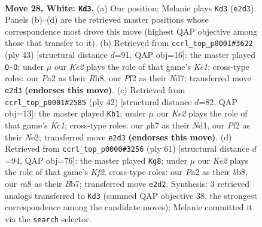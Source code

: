 \documentclass[11pt]{article}
\begin{document}
\clearpage

\begin{figure}[p]\centering
\begin{subfigure}{0.46\textwidth}\centering
\resizebox{\linewidth}{!}{%
\newchessgame
\chessboard[
  setfen={r3r3/1pp3kp/5p2/p2p2b1/6b1/NPB1P3/P3KP2/RN5q w - - 0 28},
  showmover=false,
  pgfstyle=straightmove, color=movearrow, markmove={e2-d3}
]}
\caption{}
\end{subfigure}\hfill
\begin{subfigure}{0.46\textwidth}\centering
\resizebox{\linewidth}{!}{%
\newchessgame
\chessboard[
  setfen={4k2r/1b1n1ppp/r7/2n1p3/pR6/2Q5/PPP3PP/R6K b k - 1 22},
  showmover=false,
  pgfstyle=straightmove, color=movearrow, markmove={e8-g8}
]}
\caption{}
\end{subfigure}
\\[4pt]
\begin{subfigure}{0.46\textwidth}\centering
\resizebox{\linewidth}{!}{%
\newchessgame
\chessboard[
  setfen={r1r5/4kppp/1q2p3/p1b5/Q7/2B2P2/1P2N1PP/2KN3R w - - 2 22},
  showmover=false,
  pgfstyle=straightmove, color=movearrow, markmove={c1-b1}
]}
\caption{}
\end{subfigure}\hfill
\begin{subfigure}{0.46\textwidth}\centering
\resizebox{\linewidth}{!}{%
\newchessgame
\chessboard[
  setfen={1Bn5/1b2bkp1/p4n2/1p4Nr/5R1p/3P4/PPP2P1P/2K3R1 b - - 11 31},
  showmover=false,
  pgfstyle=straightmove, color=movearrow, markmove={f7-g8}
]}
\caption{}
\end{subfigure}
\caption{\textbf{Move 28, White: \texttt{Kd3}.} (a) Our position; Melanie plays \texttt{Kd3} (\texttt{e2d3}). Panels (b)--(d) are the retrieved master positions whose correspondence most drove this move (highest QAP objective among those that transfer to it). (b) Retrieved from \texttt{ccrl\_top\_p0001\#3622} (ply 43) [structural distance $d$=91, QAP obj=16]: the master played \texttt{O-O}; under $\mu$ our \emph{Ke2} plays the role of that game's \emph{Ke1}; cross-type roles: our \emph{P}a2 as their \emph{R}h8, our \emph{P}f2 as their \emph{N}d7; transferred move \texttt{e2d3} \textbf{(endorses this move)}. (c) Retrieved from \texttt{ccrl\_top\_p0001\#2585} (ply 42) [structural distance $d$=82, QAP obj=13]: the master played \texttt{Kb1}; under $\mu$ our \emph{Ke2} plays the role of that game's \emph{Kc1}; cross-type roles: our \emph{p}h7 as their \emph{N}d1, our \emph{P}f2 as their \emph{N}e2; transferred move \texttt{e2d3} \textbf{(endorses this move)}. (d) Retrieved from \texttt{ccrl\_top\_p0000\#3256} (ply 61) [structural distance $d$=94, QAP obj=76]: the master played \texttt{Kg8}; under $\mu$ our \emph{Ke2} plays the role of that game's \emph{Kf2}; cross-type roles: our \emph{P}a2 as their \emph{b}b8, our \emph{r}a8 as their \emph{B}b7; transferred move \texttt{e2d2}. Synthesis: 3 retrieved analogs transferred to \texttt{Kd3} (summed QAP objective 38, the strongest correspondence among the candidate moves); Melanie committed it via the \texttt{search} selector.}
\label{fig:thought-m54}
\end{figure}
\end{document}
